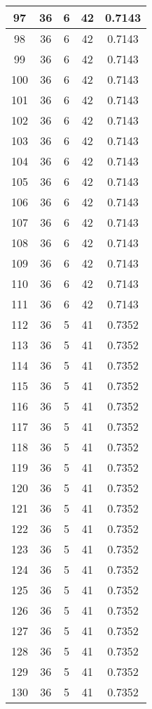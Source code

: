 \documentclass[letterpaper, 12pt]{article}
\begin{document}
\begin{longtable}{|c|c|c|c|c|}
\hline
97 & 36 & 6 & 42 & 0.7143 \\
\hline
98 & 36 & 6 & 42 & 0.7143 \\
\hline
99 & 36 & 6 & 42 & 0.7143 \\
\hline
100 & 36 & 6 & 42 & 0.7143 \\
\hline
101 & 36 & 6 & 42 & 0.7143 \\
\hline
102 & 36 & 6 & 42 & 0.7143 \\
\hline
103 & 36 & 6 & 42 & 0.7143 \\
\hline
104 & 36 & 6 & 42 & 0.7143 \\
\hline
105 & 36 & 6 & 42 & 0.7143 \\
\hline
106 & 36 & 6 & 42 & 0.7143 \\
\hline
107 & 36 & 6 & 42 & 0.7143 \\
\hline
108 & 36 & 6 & 42 & 0.7143 \\
\hline
109 & 36 & 6 & 42 & 0.7143 \\
\hline
110 & 36 & 6 & 42 & 0.7143 \\
\hline
111 & 36 & 6 & 42 & 0.7143 \\
\hline
112 & 36 & 5 & 41 & 0.7352 \\
\hline
113 & 36 & 5 & 41 & 0.7352 \\
\hline
114 & 36 & 5 & 41 & 0.7352 \\
\hline
115 & 36 & 5 & 41 & 0.7352 \\
\hline
116 & 36 & 5 & 41 & 0.7352 \\
\hline
117 & 36 & 5 & 41 & 0.7352 \\
\hline
118 & 36 & 5 & 41 & 0.7352 \\
\hline
119 & 36 & 5 & 41 & 0.7352 \\
\hline
120 & 36 & 5 & 41 & 0.7352 \\
\hline
121 & 36 & 5 & 41 & 0.7352 \\
\hline
122 & 36 & 5 & 41 & 0.7352 \\
\hline
123 & 36 & 5 & 41 & 0.7352 \\
\hline
124 & 36 & 5 & 41 & 0.7352 \\
\hline
125 & 36 & 5 & 41 & 0.7352 \\
\hline
126 & 36 & 5 & 41 & 0.7352 \\
\hline
127 & 36 & 5 & 41 & 0.7352 \\
\hline
128 & 36 & 5 & 41 & 0.7352 \\
\hline
129 & 36 & 5 & 41 & 0.7352 \\
\hline
130 & 36 & 5 & 41 & 0.7352 \\

\end{longtable}
\end{document}
